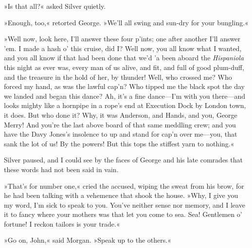 »Is that all?« asked Silver quietly.

»Enough, too,« retorted George. »We'll all swing and sun-dry for your bungling.«

»Well now, look here, I'll answer these four p'ints; one after another I'll answer 'em. I made a hash o' this cruise, did I? Well now, you all know what I wanted, and you all know if that had been done that we'd 'a been aboard the \textit{Hispaniola} this night as ever was, every man of us alive, and fit, and full of good plum-duff, and the treasure in the hold of her, by thunder! Well, who crossed me? Who forced my hand, as was the lawful cap'n? Who tipped me the black spot the day we landed and began this dance? Ah, it's a fine dance—I'm with you there—and looks mighty like a hornpipe in a rope's end at Execution Dock by London town, it does. But who done it? Why, it was Anderson, and Hands, and you, George Merry! And you're the last above board of that same meddling crew; and you have the Davy Jones's insolence to up and stand for cap'n over me—you, that sank the lot of us! By the powers! But this tops the stiffest yarn to nothing.«

Silver paused, and I could see by the faces of George and his late comrades that these words had not been said in vain.

»That's for number one,« cried the accused, wiping the sweat from his brow, for he had been talking with a vehemence that shook the house. »Why, I give you my word, I'm sick to speak to you. You've neither sense nor memory, and I leave it to fancy where your mothers was that let you come to sea. Sea! Gentlemen o' fortune! I reckon tailors is your trade.«

»Go on, John,« said Morgan. »Speak up to the others.«

